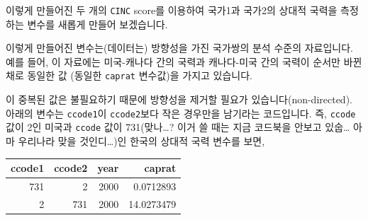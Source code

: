 \documentclass[]{book}
\newenvironment{Shaded}{\begin{snugshade}}{\end{snugshade}}
\newcommand{\DecValTok}[1]{\textcolor[rgb]{0.00,0.00,0.81}{#1}}
\newcommand{\KeywordTok}[1]{\textcolor[rgb]{0.13,0.29,0.53}{\textbf{#1}}}
\newcommand{\NormalTok}[1]{#1}
\newcommand{\OperatorTok}[1]{\textcolor[rgb]{0.81,0.36,0.00}{\textbf{#1}}}
\newcommand{\StringTok}[1]{\textcolor[rgb]{0.31,0.60,0.02}{#1}}
\begin{document}
이렇게 만들어진 두 개의 \texttt{CINC} score를 이용하여 국가1과 국가2의 상대적 국력을 측정하는 변수를 새롭게 만들어 보겠습니다.

\begin{Shaded}
\end{Shaded}

이렇게 만들어진 변수는(데이터는) 방향성을 가진 국가쌍의 분석 수준의 자료입니다. 예를 들어, 이 자료에는 미국-캐나다 간의 국력과 캐나다-미국 간의 국력이 순서만 바뀐 채로 동일한 값 (동일한 \texttt{caprat} 변수값)을 가지고 있습니다.

이 중복된 값은 불필요하기 때문에 방향성을 제거할 필요가 있습니다(non-directed). 아래의 변수는 \texttt{ccode1}이 \texttt{ccode2}보다 작은 경우만을 남기라는 코드입니다. 즉, \texttt{ccode} 값이 2인 미국과 \texttt{ccode} 값이 731(맞나\ldots{}? 이거 쓸 때는 지금 코드북을 안보고 있숩\ldots{} 아마 우리나라 맞을 것인디\ldots{})인 한국의 상대적 국력 변수를 보면,

\begin{Shaded}
\end{Shaded}

\begin{tabular}{r|r|r|r}
\hline
ccode1 & ccode2 & year & caprat\\
\hline
731 & 2 & 2000 & 0.0712893\\
\hline
2 & 731 & 2000 & 14.0273479\\
\hline
\end{tabular}
\end{document}
